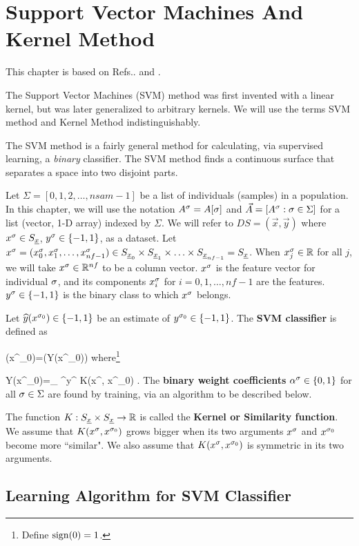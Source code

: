 \chapter{Support Vector Machines And Kernel Method}
\label{ch-svm}
This chapter is based on Refs.\cite{wiki-kernel-way}.
\cite{wiki-svm} and \cite{wiki-kernel-per}.

The Support Vector Machines (SVM) method
was first invented with a linear kernel, but
was later generalized to arbitrary kernels.
We will use the terms SVM method and Kernel Method
indistinguishably. 

The SVM method is a
fairly general method
for
calculating, via supervised learning, a
{\it binary} classifier.
The SVM method
finds a continuous surface
that separates a space into two 
disjoint parts.


Let $\Sigma=[0,1,2, \ldots, nsam-1]$ be a list of
individuals (samples) in a population.
In this chapter, we will use the notation 
$A^\sigma=A[\sigma]$ 
and $\vec{A}=[A^\sigma:\sigma\in \Sigma]$
for a  list (vector, 1-D  array) 
indexed by $\Sigma$.
We will refer to $DS=(\vec{x}, \vec{y})$ 
where $x^\sigma\in S_{\underline{x}}$,
 $y^\sigma\in \{-1, 1\}$,
as a dataset. Let
$x^\sigma=(x^\sigma_0, x^\sigma_1, 
\ldots, x^\sigma_{nf-1})
\in S_{{\underline{x}}_0}\times S_{{\underline{x}}_1}
\times\ldots\times
 S_{{\underline{x}}_{nf-1}}=S_{\underline{x}}$.
When $x^\sigma_j\in { \mathbb{R}}$ for all 
$j$,
we will take $x^\sigma\in { \mathbb{R}}^{nf}$ 
to be a column vector.
$x^\sigma$ is the feature vector for individual
$\sigma$, and its components $x^\sigma_i$
for $i=0,1,\ldots, nf-1$ are the features.
$y^\sigma\in \{-1, 1\}$ is the binary 
class to which $x^\sigma$ belongs.

Let ${\widehat{y}}(x^{\sigma_0})\in\{-1, 1\}$ be an estimate of
$y^{\sigma_0}\in\{-1, 1\}$.
The {\bf SVM classifier} is defined as

\beq
\haty(x^{\s_0})=\sign(Y(x^{\s_0}))
\label{eq-svm-haty}
\eeq
where\footnote{Define ${\rm sign}(0)=1$.}

\beq
Y(x^{\s_0})=\sum_\s
\alp^\s y^\s 
K(x^\s, x^{\s_0})
\;.
\label{eq-yy-x-sig}
\eeq
The {\bf binary weight coefficients} $\alpha^\sigma\in \{0,1\}$
for all $\sigma\in\Sigma$ are found 
by training, via an algorithm
to be described below.

The function $K:S_{\underline{x}}\times S_{\underline{x}}
\rightarrow { \mathbb{R}}$
is called the {\bf Kernel 
or Similarity function}.
We assume that
$K(x^\sigma, x^{\sigma_0})$ grows bigger
when its two arguments
$x^\sigma$ and $x^{\sigma_0}$ 
become more ``similar".
We
also assume that
$K(x^\sigma, x^{\sigma_0})$ is symmetric in its two arguments.

\section{Learning Algorithm for SVM Classifier}



